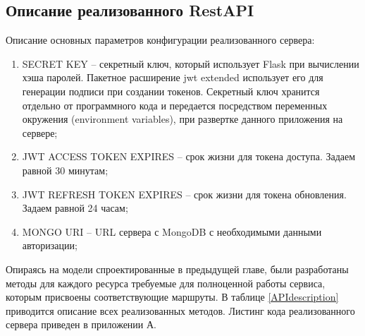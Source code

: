 \subsection{Описание реализованного RestAPI}

Описание основных параметров конфигурации реализованного сервера:
\begin{enumerate}
	\item SECRET KEY -- секретный ключ, который использует Flask при
	вычислении хэша паролей. Пакетное расширение jwt extended использует его для генерации подписи при создании токенов. Секретный ключ хранится отдельно от программного кода и передается посредством переменных окружения (environment variables), при развертке данного приложения на сервере;
	\item JWT ACCESS TOKEN EXPIRES -- срок жизни для токена доступа.  Задаем равной 30 минутам;
	\item JWT REFRESH TOKEN EXPIRES -- срок жизни для токена обновления. Задаем равной 24 часам;
	\item MONGO URI -- URL сервера с MongoDB с необходимыми
	данными авторизации;
\end{enumerate}

Опираясь на модели спроектированные в предыдущей главе, были разработаны методы для каждого ресурса требуемые для полноценной работы сервиса, которым присвоены соответствующие маршруты. В таблице \ref{APIdescription} приводится описание всех реализованных методов. Листинг кода реализованного сервера приведен в приложении А.  

